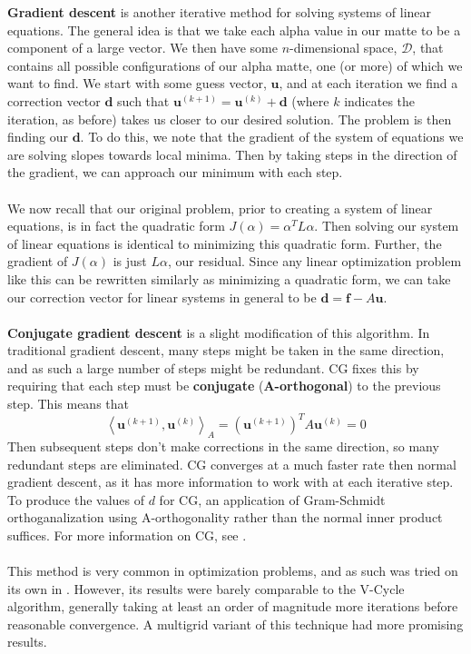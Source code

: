 \textbf{Gradient descent} is another iterative method for solving systems of linear equations. The general idea is that we take each alpha value in our matte to be a component of a large vector. We then have some $n$-dimensional space, $\mathcal{D}$, that contains all possible configurations of our alpha matte, one (or more) of which we want to find. We start with some guess vector, $\textbf{u}$, and at each iteration we find a correction vector $\textbf{d}$ such that $\textbf{u}^{(k+1)} = \textbf{u}^{(k)}+\textbf{d}$ (where $k$ indicates the iteration, as before) takes us closer to our desired solution. The problem is then finding our $\textbf{d}$. To do this, we note that the gradient of the system of equations we are solving slopes towards local minima. Then by taking steps in the direction of the gradient, we can approach our minimum with each step.
\\\\
We now recall that our original problem, prior to creating a system of linear equations, is in fact the quadratic form $J(\alpha)=\alpha^TL\alpha$. Then solving our system of linear equations is identical to minimizing this quadratic form. Further, the gradient of $J(\alpha)$ is just $L\alpha$, our residual. Since any linear optimization problem like this can be rewritten similarly as minimizing a quadratic form, we can take our correction vector for linear systems in general to be $\textbf{d}=\textbf{f}-A\textbf{u}$.
\\\\
\textbf{Conjugate gradient descent} is a slight modification of this algorithm. In traditional gradient descent, many steps might be taken in the same direction, and as such a large number of steps might be redundant. CG fixes this by requiring that each step must be \textbf{conjugate} (\textbf{A-orthogonal}) to the previous step. This means that
\[\left\langle \textbf{u}^{(k+1)},\textbf{u}^{(k)}\right\rangle_A = \left(\textbf{u}^{(k+1)}\right)^TA\textbf{u}^{(k)}=0\]
Then subsequent steps don't make corrections in the same direction, so many redundant steps are eliminated. CG converges at a much faster rate then normal gradient descent, as it has more information to work with at each iterative step. To produce the values of $d$ for CG, an application of Gram-Schmidt orthoganalization using A-orthogonality rather than the normal inner product suffices. For more information on CG, see \cite{shewchuk94}.
\\\\
This method is very common in optimization problems, and as such was tried on its own in \cite{lee14}. However, its results were barely comparable to the V-Cycle algorithm, generally taking at least an order of magnitude more iterations before reasonable convergence. A multigrid variant of this technique had more promising results.